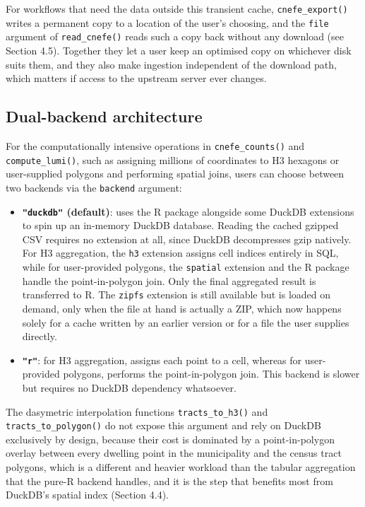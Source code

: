 For workflows that need the data outside this transient cache,
\texttt{cnefe\_export()} writes a permanent copy to a location of the user's
choosing, and the \texttt{file} argument of \texttt{read\_cnefe()} reads such a copy
back without any download (see Section 4.5). Together they let a user
keep an optimised copy on whichever disk suits them, and they also make
ingestion independent of the download path, which matters if access to
the upstream server ever changes.

\subsection{Dual-backend architecture}\label{dual-backend-architecture}

For the computationally intensive operations in \texttt{cnefe\_counts()} and
\texttt{compute\_lumi()}, such as assigning millions of coordinates to H3
hexagons or user-supplied polygons and performing spatial joins, users
can choose between two backends via the \texttt{backend} argument:

\begin{itemize}
\item
  \textbf{\texttt{"duckdb"} (default)}: uses the  \citep{duckdb_r2024}
  R package alongside some DuckDB extensions to spin up an in-memory DuckDB database.
  Reading the cached gzipped CSV requires no extension at all, since
  DuckDB decompresses gzip natively. For H3 aggregation, the \texttt{h3}
  extension assigns cell indices entirely in SQL, while for
  user-provided polygons, the \texttt{spatial} extension and the
   R package \citep{duckspatial2026} handle the
  point-in-polygon join.
  Only the final aggregated result is transferred to R. The \texttt{zipfs}
  extension is still available but is loaded on demand, only when the
  file at hand is actually a ZIP, which now happens solely for a cache
  written by an earlier version or for a file the user supplies
  directly.
\item
  \textbf{\texttt{"r"}}: for H3 aggregation,  assigns each point to
  a cell, whereas for user-provided polygons,  performs
  the point-in-polygon join. This backend is slower but requires no
  DuckDB dependency whatsoever.
\end{itemize}

The dasymetric interpolation functions \texttt{tracts\_to\_h3()} and
\texttt{tracts\_to\_polygon()} do not expose this argument and rely on DuckDB
exclusively by design, because their cost is dominated by a
point-in-polygon overlay between every dwelling point in the
municipality and the census tract polygons, which is a different and
heavier workload than the tabular aggregation that the pure-R backend
handles, and it is the step that benefits most from DuckDB's spatial
index (Section 4.4).

